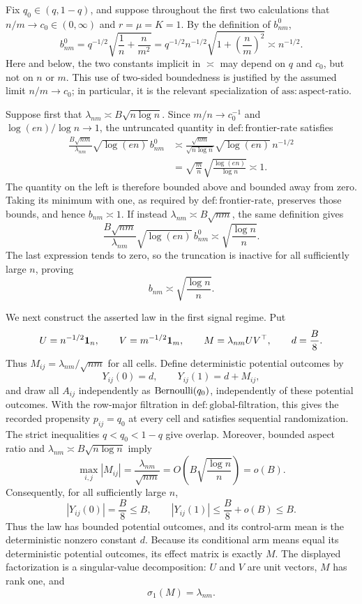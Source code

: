 Fix \(q_0\in(q,1-q)\), and suppose throughout the first two calculations that \(n/m\to c_0\in(0,\infty)\) and \(r=\mu=K=1\).  By the definition of \(b^0_{nm}\),
\[
 b^0_{nm}
 =q^{-1/2}\sqrt{\frac1n+\frac{n}{m^2}}
 =q^{-1/2}n^{-1/2}\sqrt{1+\left(\frac nm\right)^2}
 \asymp n^{-1/2}.
\]
Here and below, the two constants implicit in \(\asymp\) may depend on \(q\) and \(c_0\), but not on \(n\) or \(m\).  This use of two-sided boundedness is justified by the assumed limit \(n/m\to c_0\); in particular, it is the relevant specialization of \(\mathrm{ass:aspect\mbox{-}ratio}\).

Suppose first that \(\lambda_{nm}\asymp B\sqrt{n\log n}\).  Since \(m/n\to c_0^{-1}\) and \(\log(en)/\log n\to1\), the untruncated quantity in \(\mathrm{def:frontier\mbox{-}rate}\) satisfies
\[
 \begin{aligned}
 \frac{B\sqrt{nm}}{\lambda_{nm}}\sqrt{\log(en)}\,b^0_{nm}
 &\asymp
 \frac{\sqrt{nm}}{\sqrt{n\log n}}
 \sqrt{\log(en)}\,n^{-1/2}\\
 &=\sqrt{\frac mn}\sqrt{\frac{\log(en)}{\log n}}
 \asymp1.
 \end{aligned}
\]
The quantity on the left is therefore bounded above and bounded away from zero.  Taking its minimum with one, as required by \(\mathrm{def:frontier\mbox{-}rate}\), preserves those bounds, and hence \(b_{nm}\asymp1\).  If instead \(\lambda_{nm}\asymp B\sqrt{nm}\), the same definition gives
\[
 \frac{B\sqrt{nm}}{\lambda_{nm}}\sqrt{\log(en)}\,b^0_{nm}
 \asymp\sqrt{\frac{\log n}{n}}.
\]
The last expression tends to zero, so the truncation is inactive for all sufficiently large \(n\), proving
\[
 b_{nm}\asymp\sqrt{\frac{\log n}{n}}.
\]

We next construct the asserted law in the first signal regime.  Put
\[
 U=n^{-1/2}{\bf 1}_n,
 \qquad
 V=m^{-1/2}{\bf 1}_m,
 \qquad
 M=\lambda_{nm}UV^\top,
 \qquad
 d=\frac B8.
\]
Thus \(M_{ij}=\lambda_{nm}/\sqrt{nm}\) for all cells.  Define deterministic potential outcomes by
\[
 Y_{ij}(0)=d,
 \qquad
 Y_{ij}(1)=d+M_{ij},
\]
and draw all \(A_{ij}\) independently as \({\rm Bernoulli}(q_0)\), independently of these potential outcomes.  With the row-major filtration in \(\mathrm{def:global\mbox{-}filtration}\), this gives the recorded propensity \(p_{ij}=q_0\) at every cell and satisfies sequential randomization.  The strict inequalities \(q<q_0<1-q\) give overlap.  Moreover, bounded aspect ratio and \(\lambda_{nm}\asymp B\sqrt{n\log n}\) imply
\[
 \max_{i,j}|M_{ij}|
 =\frac{\lambda_{nm}}{\sqrt{nm}}
 =O\!\left(B\sqrt{\frac{\log n}{n}}\right)
 =o(B).
\]
Consequently, for all sufficiently large \(n\),
\[
 |Y_{ij}(0)|=\frac B8\le B,
 \qquad
 |Y_{ij}(1)|\le\frac B8+o(B)\le B.
\]
Thus the law has bounded potential outcomes, and its control-arm mean is the deterministic nonzero constant \(d\).  Because its conditional arm means equal its deterministic potential outcomes, its effect matrix is exactly \(M\).  The displayed factorization is a singular-value decomposition: \(U\) and \(V\) are unit vectors, \(M\) has rank one, and
\[
 \sigma_1(M)=\lambda_{nm}.
\]

